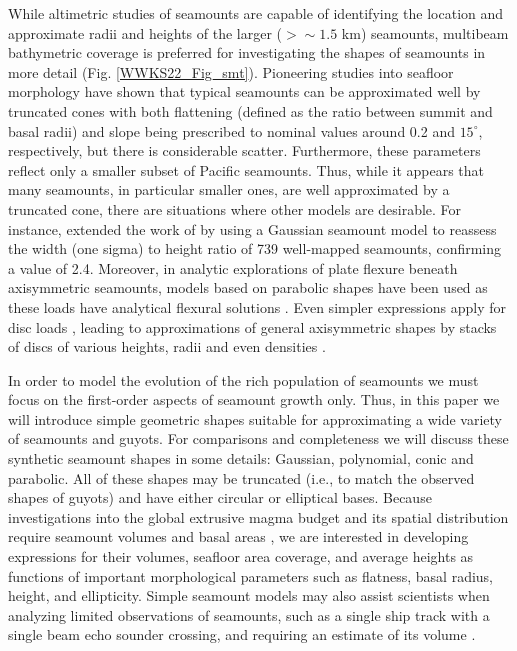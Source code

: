 While altimetric studies of seamounts are capable of identifying the location and approximate radii
and heights of the larger ($> \sim 1.5$ km) seamounts, multibeam bathymetric coverage is preferred for investigating
the shapes of seamounts in more detail (Fig. \ref{WWKS22_Fig_smt}).  Pioneering studies into seafloor morphology
\citep{JMS1983,SJ1988,S1988} have shown that typical seamounts can be approximated well by truncated cones
with both flattening (defined as the ratio between summit and basal radii) and slope being prescribed
to nominal values around 0.2 and $15^\circ$, respectively, but there is considerable scatter. Furthermore,
these parameters reflect only a smaller subset of Pacific seamounts.
Thus, while it appears that many seamounts, in particular smaller ones, are well approximated by a truncated cone,
there are situations where other models are desirable.  For instance, \citet{G2022} extended the work of
\citet{S1988} by using a Gaussian seamount model to reassess the width (one sigma) to height ratio of 739
well-mapped seamounts, confirming a value of 2.4.  Moreover, in analytic explorations of plate flexure
beneath axisymmetric seamounts, models based on parabolic shapes have been used as these loads have analytical
flexural solutions \citep[e.g.,~][]{LN1980,W2001,KW2010}.  Even simpler expressions apply for disc loads
\citep{BS1969}, leading to approximations of general axisymmetric shapes by stacks of discs of various heights,
radii and even densities \citep[e.g.,~][]{HC1994}.

In order to model the evolution of the rich population of seamounts we must focus on the first-order
aspects of seamount growth only.  Thus, in this paper we will introduce simple geometric shapes suitable
for approximating a wide variety of seamounts and guyots.
For comparisons and completeness we will discuss these synthetic
seamount shapes in some details: Gaussian, polynomial, conic and parabolic.  All of these shapes may be truncated
(i.e., to match the observed shapes of guyots) and have either circular or elliptical bases.  Because investigations
into the global extrusive magma budget and its spatial distribution require seamount volumes and basal areas \citep[e.g.,~][]{B1982},
we are interested in developing expressions for their volumes, seafloor area coverage, and average heights
as functions of important morphological parameters such as flatness, basal radius, height, and ellipticity.
Simple seamount models may also assist scientists when analyzing limited observations of seamounts, such as a single
ship track with a single beam echo sounder crossing, and requiring an estimate of its volume \citep[e.g.,~][]{HW2007}. 

